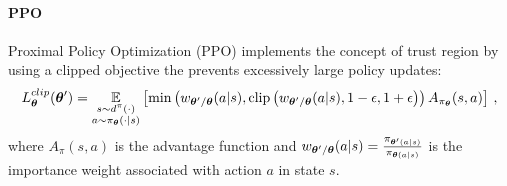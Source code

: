  \paragraph{PPO} Proximal Policy Optimization (PPO) \citep{ppo} implements the concept of trust region by using a clipped objective the prevents excessively large policy updates:
 \begin{equation}
 	L^{clip}_{\boldsymbol{\theta}}(\boldsymbol{\theta}') = \underset{
 	\begin{subarray}{c}
 		s \sim d^\pi(\cdot) \\
 		a \sim \pi_{\boldsymbol{\theta}}(\cdot | s)
 	\end{subarray}
 	}{\mathbb{E}} \left[ \min \left( w_{\bm{\mathbf{\theta}}'/\bm{\mathbf{\theta}}}(a | s), \text{clip} \left( w_{\bm{\mathbf{\theta}}'/\bm{\mathbf{\theta}}}(a | s), 1-\epsilon, 1+\epsilon \right)\right) A_{\pi_{\boldsymbol{\theta}}}(s,a) \right] \, ,
 \end{equation}
 where $A_\pi (s,a)$ is the advantage function and $w_{\bm{\mathbf{\theta}}'/\bm{\mathbf{\theta}}}(a | s) = \frac{\pi_{\boldsymbol{\theta}'(a | s)}}{\pi_{\boldsymbol{\theta}(a | s)}}$ is the importance weight associated with action $a$ in state $s$.
 \newline
